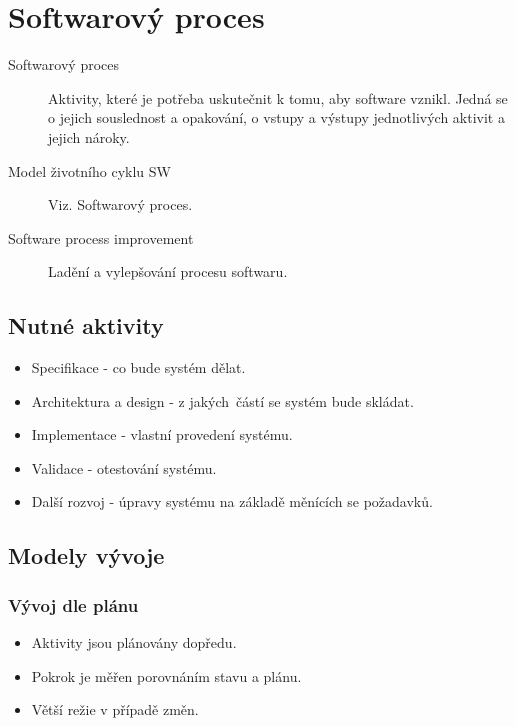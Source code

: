 \section{Softwarový proces}
  \begin{description}
    \item[Softwarový proces] Aktivity, které je potřeba uskutečnit k tomu, aby software vznikl.
    Jedná se o jejich souslednost a opakování, o vstupy a výstupy jednotlivých aktivit a jejich nároky.
    \item[Model životního cyklu SW] Viz. Softwarový proces.
    \item[Software process improvement] Ladění a vylepšování procesu softwaru.
  \end{description}

  \subsection{Nutné aktivity}
  \begin{itemize}
    \item Specifikace - co bude systém dělat.
    \item Architektura a design - z jakých částí se systém bude skládat.
    \item Implementace - vlastní provedení systému.
    \item Validace - otestování systému.
    \item Další rozvoj - úpravy systému na základě měnících se požadavků.
  \end{itemize}

  \subsection{Modely vývoje}

    \subsubsection{Vývoj dle plánu}
      \begin{itemize}
        \item Aktivity jsou plánovány dopředu.
        \item Pokrok je měřen porovnáním stavu a plánu.
        \item Větší režie v případě změn.
      \end{itemize}

